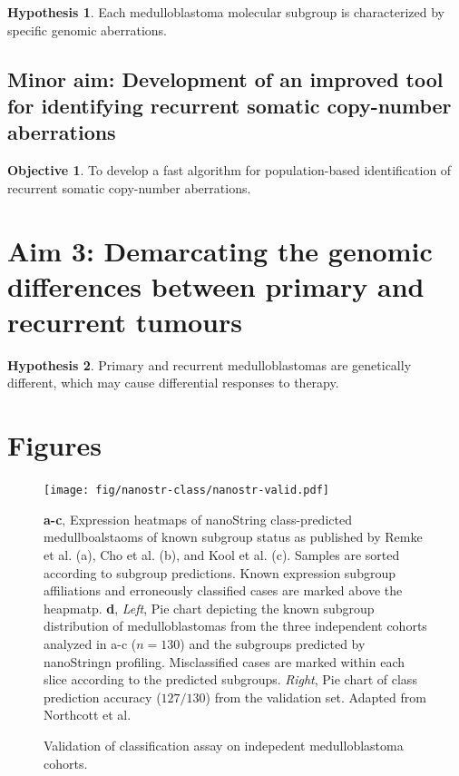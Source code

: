 \documentclass[11pt,letterpaper]{article}
\theoremstyle{definition}
\newtheorem*{hypothesis}{Hypothesis}
\newtheorem*{objective}{Objective}
\begin{document}
\begin{hypothesis}
Each medulloblastoma molecular subgroup is characterized by specific genomic aberrations.
\end{hypothesis}

\subsection{Minor aim: Development of an improved tool for identifying recurrent somatic copy-number aberrations}

\begin{objective}
To develop a fast algorithm for population-based identification of recurrent somatic copy-number aberrations.
\end{objective}

\section{Aim 3: Demarcating the genomic differences between primary and recurrent tumours}

\begin{hypothesis}
Primary and recurrent medulloblastomas are genetically different, which may cause differential responses to therapy.
\end{hypothesis}


\section{Figures}

\begin{figure}[h]
	\begin{center}
		\texttt{[image: fig/nanostr-class/nanostr-valid.pdf]}
	\end{center}
	\caption{Validation of classification assay on indepedent medulloblastoma cohorts.}
	\textbf{a-c}, Expression heatmaps of nanoString class-predicted medullboalstaoms of known subgroup status as published by Remke et al. (a), Cho et al. (b), and Kool et al. (c). Samples are sorted according to subgroup predictions. Known expression subgroup affiliations and erroneously classified cases are marked above the heapmatp. \textbf{d}, \emph{Left}, Pie chart depicting the known subgroup distribution of medulloblastomas from the three independent cohorts analyzed in a-c ($n = 130$) and the subgroups predicted by nanoStringn profiling. Misclassified cases are marked within each slice according to the predicted subgroups. \emph{Right}, Pie chart of class prediction accuracy ($127/130$) from the validation set. Adapted from Northcott et al.
	\label{fig:nanostr-valid}
\end{figure}
\end{document}
